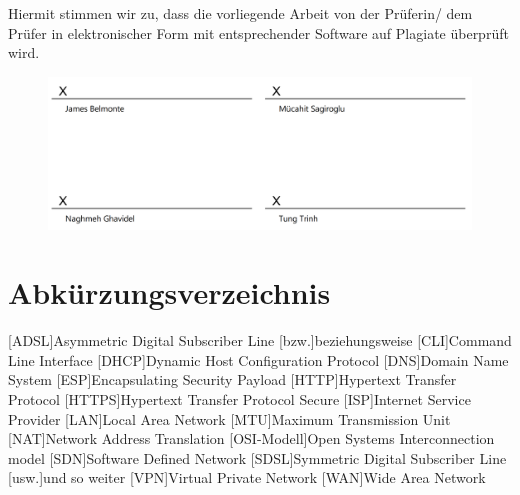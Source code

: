 \documentclass[fontsize=12pt,paper=a4,open=any,parskip=half,
  twoside=false,toc=listof,toc=bibliography,fleqn,leqno,
  captions=nooneline,captions=tableabove,british]{scrbook}
\begin{document}
Hiermit stimmen wir zu, dass die vorliegende Arbeit von der Prüferin/ dem Prüfer in elektronischer Form
mit entsprechender Software auf Plagiate überprüft wird.

\begin{figure}[H]
	\centering
	\includegraphics[width=1\linewidth]{Bilder/unterschrift}
\end{figure}

\tableofcontents
\listoffigures
\listoftables
\chapter{Abkürzungsverzeichnis}
\begin{acronym}
	[ADSL]{Asymmetric Digital Subscriber Line}
	[bzw.]{beziehungsweise}
	[CLI]{Command Line Interface}
	[DHCP]{Dynamic Host Configuration Protocol}
	[DNS]{Domain Name System}
	[ESP]{Encapsulating Security Payload}
	[HTTP]{Hypertext Transfer Protocol }
	[HTTPS]{Hypertext Transfer Protocol Secure}
	[ISP]{Internet Service Provider}
	[LAN]{Local Area Network}
	[MTU]{Maximum Transmission Unit}
	[NAT]{Network Address Translation}
	[OSI-Modell]{Open Systems Interconnection model}
	[SDN]{Software Defined Network}
	[SDSL]{Symmetric Digital Subscriber Line}
	[usw.]{und so weiter}
	[VPN]{Virtual Private Network}
	[WAN]{Wide Area Network}
\end{acronym}


\mainmatter %

\end{document}
